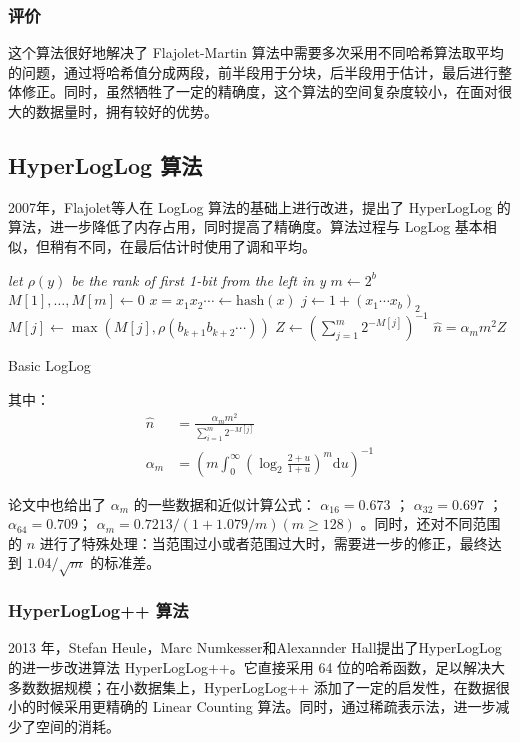 \documentclass{ctexart}
\begin{document}
\subsubsection{评价}
    这个算法很好地解决了 Flajolet-Martin 算法中需要多次采用不同哈希算法取平均的问题，通过将哈希值分成两段，前半段用于分块，后半段用于估计，最后进行整体修正。同时，虽然牺牲了一定的精确度，这个算法的空间复杂度较小，在面对很大的数据量时，拥有较好的优势。

\subsection{HyperLogLog 算法 \cite{Flajolet:2007um}}
    2007年，Flajolet等人在 LogLog 算法的基础上进行改进，提出了 HyperLogLog 的算法，进一步降低了内存占用，同时提高了精确度。算法过程与 LogLog 基本相似，但稍有不同，在最后估计时使用了调和平均。

    \begin{algorithm}
        \BlankLine
        \emph{let $\rho(y)$ be the rank of first 1-bit from the left in y}\;
        $m \leftarrow 2^b$\;
        $M[1],\ldots ,M[m] \leftarrow 0$\;
         {
            $x = x_1x_2 \cdots \leftarrow \mathrm{hash}(x)$\;
            $j \leftarrow 1 + (x_1\cdots x_b)_2$\;
            $M[j] \leftarrow \max(M[j], \rho(b_{k+1}b_{k+2}\cdots))$\;
        }
        $Z \leftarrow \left(\sum_{j=1}^m{2^{-M[j]}}\right)^{-1}$\;
        $\hat{n} = \alpha_mm^2Z$\;
        \caption{Basic LogLog}
    \end{algorithm}

    其中：
    \begin{align*}
        \hat{n} &= \frac{\alpha_mm^2}{\sum_{i=1}^m2^{-M[j]}} \\
        \alpha_m &= \left(m\int_0^{\infty}\left(\log_2{\frac{2+u}{1+u}}\right)^m\mathrm{d}u\right)^{-1}
    \end{align*}

    论文中也给出了 $\alpha_m$ 的一些数据和近似计算公式： $\alpha_{16} = 0.673$ ； $\alpha_{32} = 0.697$ ； $\alpha_{64} = 0.709$； $\alpha_m=0.7213/(1+1.079/m) (m \ge 128)$ 。同时，还对不同范围的 $n$ 进行了特殊处理：当范围过小或者范围过大时，需要进一步的修正，最终达到 $1.04/\sqrt{m}$ 的标准差。

\subsubsection{HyperLogLog++ 算法 \cite{40671}}
    2013 年，Stefan Heule，Marc Numkesser和Alexannder Hall提出了HyperLogLog的进一步改进算法 HyperLogLog++。它直接采用 64 位的哈希函数，足以解决大多数数据规模；在小数据集上，HyperLogLog++ 添加了一定的启发性，在数据很小的时候采用更精确的 Linear Counting 算法。同时，通过稀疏表示法，进一步减少了空间的消耗。
\end{document}
